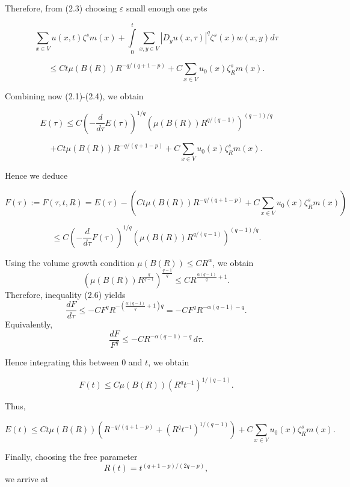 \documentclass{article}
\begin{document}
	
	Therefore, from (2.3) choosing $\varepsilon $ small enough one gets
	
	\[
	\sum\limits_{x\in V}u(x,t)\zeta
	^{s}m(x)+\int\limits_{0}^{t}\sum\limits_{x,y\in V}\left\vert D_{y}u(x,\tau
	)\right\vert ^{q}\zeta ^{s}(x)w(x,y)d\tau
	\]
	
	\begin{equation}
		\leq Ct\mu (B(R))R^{-q/(q+1-p)}+C\sum\limits_{x\in V}u_{0}(x)\zeta
		_{R}^{s}m(x)\text{.}  \tag{2.4}
	\end{equation}
	
	Combining now (2.1)-(2.4), we obtain
	
	\[
	E(\tau )\leq C\left( -\frac{d}{d\tau }E(\tau )\right) ^{1/q}\left( \mu
	(B(R))R^{q/(q-1)}\right) ^{(q-1)/q}
	\]
	
	\begin{equation}
		+Ct\mu (B(R))R^{-q/(q+1-p)}+C\sum\limits_{x\in V}u_{0}(x)\zeta _{R}^{s}m(x).
		\tag{2.5}
	\end{equation}
	
	Hence we deduce
	
	\[
	F(\tau ):=F(\tau ,t,R)=E(\tau )-\left( Ct\mu
	(B(R))R^{-q/(q+1-p)}+C\sum\limits_{x\in V}u_{0}(x)\zeta _{R}^{s}m(x)\right)
	\]
	
	\begin{equation}
		\leq C\left( -\frac{d}{d\tau }F(\tau )\right) ^{1/q}\left( \mu
		(B(R))R^{q/(q-1)}\right) ^{(q-1)/q}\text{.}  \tag{2.6}
	\end{equation}
	
	Using the volume growth condition $\mu(B(R)) \le C R^\alpha$, we obtain
	\[
	\left( \mu(B(R)) R^{\frac{q}{q-1}} \right)^{\frac{q-1}{q}}
	\le C R^{\frac{\alpha(q-1)}{q} + 1}.
	\]
	Therefore, inequality (2.6) yields
	\[
	\frac{dF}{d\tau} \le - C F^q R^{-\left(\frac{\alpha(q-1)}{q} + 1\right)q}
	= - C F^q R^{-\alpha(q-1) - q}.
	\]
	Equivalently,
	\[
	\frac{dF}{F^q} \le - C R^{-\alpha(q-1) - q} \, d\tau.
	\]
	
	Hence integrating this between $0$ and $t$, we obtain
	
	\[
	F(t)\leq C\mu (B(R))\left( R^{q}t^{-1}\right) ^{1/(q-1)}\text{.}
	\]
	
	Thus,
	
	\begin{equation}
		E(t)\leq Ct\mu (B(R))\left( R^{-q/(q+1-p)}+\left( R^{q}t^{-1}\right)
		^{1/(q-1)}\right) +C\sum\limits_{x\in V}u_{0}(x)\zeta _{R}^{s}m(x).
		\tag{2.7}
	\end{equation}
	
	Finally, choosing the free parameter
	\[
	R(t)=t^{(q+1-p)/(2q-p)},
	\]
	we arrive at
	
\end{document}
